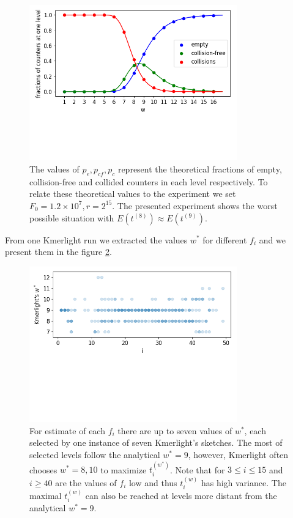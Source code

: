 \begin{figure}
\centerline{\includegraphics[width=0.8\textwidth, trim={0cm, 3.5cm, 0cm, 0cm}, clip]{images/pcf.png}}
\caption[Plot of $p_e, p_{cf}, p_c$ across the levels]{The values of $p_e, p_{cf}, p_c$ 
represent the theoretical fractions of empty, collision-free and collided counters in
each level respectively. To relate these theoretical values to the experiment we set 
$F_0 = 1.2 \times 10^7, r = 2^{15}$. The presented experiment shows the worst possible
situation with $E(t^{(8)}) \approx E(t^{(9)})$.}
\label{img:pe-pcf-pc}
\end{figure}

From one Kmerlight run we extracted the values $w^*$ for different $f_i$ and we present them in the figure \ref{img:w-selected-by-kmerlight}.

\begin{figure}
\centerline{\includegraphics[width=0.8\textwidth, trim={0cm, 5.5cm, 0cm, 0cm}, clip]{images/kmerlight_wstar.png}}
\caption[$w^*$ selected by Kmerlight]{For estimate of each $f_i$ there are up to seven
values of $w^*$, each selected by one instance of seven Kmerlight's sketches. The most of 
selected levels follow the analytical $w^* = 9$, however, Kmerlight often chooses 
$w^* = 8, 10$ to maximize $t_i^{(w^*)}$. Note that for $3\leq i \leq 15$ and $i \geq 40$
are the values of $f_i$ low and thus $t_i^{(w)}$ has high variance. The maximal
$t_i^{(w)}$ can also be reached at levels more distant from the analytical $w^* = 9$.}
\label{img:w-selected-by-kmerlight}
\end{figure}
